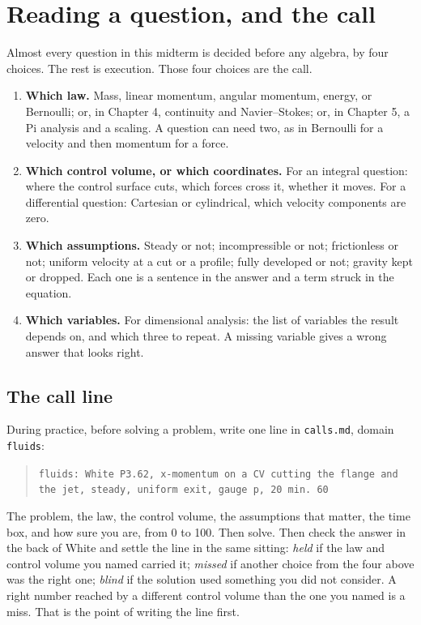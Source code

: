 \section{Reading a question, and the call}
\label{sec:call}

Almost every question in this midterm is decided before any algebra, by four choices. The rest is execution. Those four choices are the call.

\begin{enumerate}[nosep,leftmargin=*]
\item \textbf{Which law.} Mass, linear momentum, angular momentum, energy, or Bernoulli; or, in Chapter 4, continuity and Navier--Stokes; or, in Chapter 5, a Pi analysis and a scaling. A question can need two, as in Bernoulli for a velocity and then momentum for a force.
\item \textbf{Which control volume, or which coordinates.} For an integral question: where the control surface cuts, which forces cross it, whether it moves. For a differential question: Cartesian or cylindrical, which velocity components are zero.
\item \textbf{Which assumptions.} Steady or not; incompressible or not; frictionless or not; uniform velocity at a cut or a profile; fully developed or not; gravity kept or dropped. Each one is a sentence in the answer and a term struck in the equation.
\item \textbf{Which variables.} For dimensional analysis: the list of variables the result depends on, and which three to repeat. A missing variable gives a wrong answer that looks right.
\end{enumerate}

\subsection*{The call line}

During practice, before solving a problem, write one line in \texttt{calls.md}, domain \texttt{fluids}:

\begin{quote}\small
\texttt{fluids: White P3.62, x-momentum on a CV cutting the flange and the jet, steady, uniform exit, gauge p, 20 min. 60}
\end{quote}

The problem, the law, the control volume, the assumptions that matter, the time box, and how sure you are, from 0 to 100. Then solve. Then check the answer in the back of White and settle the line in the same sitting: \emph{held} if the law and control volume you named carried it; \emph{missed} if another choice from the four above was the right one; \emph{blind} if the solution used something you did not consider. A right number reached by a different control volume than the one you named is a miss. That is the point of writing the line first.

